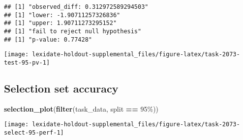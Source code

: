 \documentclass[
]{book}
\newenvironment{Shaded}{\begin{snugshade}}{\end{snugshade}}
\newcommand{\AttributeTok}[1]{\textcolor[rgb]{0.13,0.29,0.53}{#1}}
\newcommand{\DecValTok}[1]{\textcolor[rgb]{0.00,0.00,0.81}{#1}}
\newcommand{\FunctionTok}[1]{\textcolor[rgb]{0.13,0.29,0.53}{\textbf{#1}}}
\newcommand{\NormalTok}[1]{#1}
\newcommand{\OtherTok}[1]{\textcolor[rgb]{0.56,0.35,0.01}{#1}}
\newcommand{\SpecialCharTok}[1]{\textcolor[rgb]{0.81,0.36,0.00}{\textbf{#1}}}
\newcommand{\StringTok}[1]{\textcolor[rgb]{0.31,0.60,0.02}{#1}}
\begin{document}
\begin{Shaded}
\end{Shaded}

\begin{verbatim}
## [1] "observed_diff: 0.312972589294503"
## [1] "lower: -1.90711257326836"
## [1] "upper: 1.90711273295152"
## [1] "fail to reject null hypothesis"
## [1] "p-value: 0.77428"
\end{verbatim}

\texttt{[image: lexidate-holdout-supplemental\_files/figure-latex/task-2073-test-95-pv-1]}

\hypertarget{selection-set-accuracy-44}{%
\subsection{Selection set accuracy}\label{selection-set-accuracy-44}}

\begin{Shaded}
\begin{Highlighting}[]
\FunctionTok{selection\_plot}\NormalTok{(}\FunctionTok{filter}\NormalTok{(task\_data, split }\SpecialCharTok{==} \StringTok{\textquotesingle{}95\%\textquotesingle{}}\NormalTok{))}
\end{Highlighting}
\end{Shaded}

\texttt{[image: lexidate-holdout-supplemental\_files/figure-latex/task-2073-select-95-perf-1]}
\end{document}

